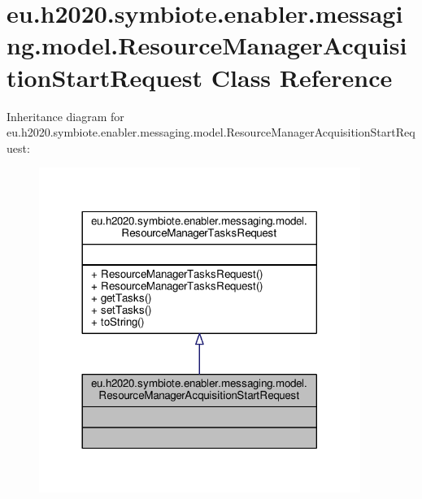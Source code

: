\hypertarget{classeu_1_1h2020_1_1symbiote_1_1enabler_1_1messaging_1_1model_1_1ResourceManagerAcquisitionStartRequest}{}\section{eu.\+h2020.\+symbiote.\+enabler.\+messaging.\+model.\+Resource\+Manager\+Acquisition\+Start\+Request Class Reference}
\label{classeu_1_1h2020_1_1symbiote_1_1enabler_1_1messaging_1_1model_1_1ResourceManagerAcquisitionStartRequest}


Inheritance diagram for eu.\+h2020.\+symbiote.\+enabler.\+messaging.\+model.\+Resource\+Manager\+Acquisition\+Start\+Request\+:\nopagebreak
\begin{figure}[H]
\begin{center}
\leavevmode
\includegraphics[width=296pt]{classeu_1_1h2020_1_1symbiote_1_1enabler_1_1messaging_1_1model_1_1ResourceManagerAcquisitionStartRequest__inherit__graph}
\end{center}
\end{figure}


